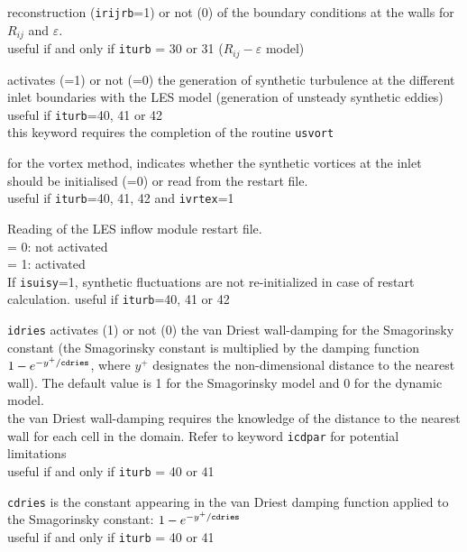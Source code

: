 {reconstruction ({\tt irijrb}=1)
or not (0) of the boundary conditions at the walls for $R_{ij}$ and  $\varepsilon$.\\
useful if and only if {\tt iturb} = 30 or 31 ($R_{ij}-\varepsilon$ model)}



{activates (=1) or not (=0) the generation of synthetic turbulence at the
different inlet boundaries with the LES model (generation of unsteady synthetic
eddies)\\
useful if {\tt iturb}=40, 41 or 42\\
this keyword requires the completion of the routine
\texttt{usvort}}

{for the vortex method, indicates whether the synthetic vortices at the inlet
should be initialised (=0) or read from the restart file.\\
useful if {\tt iturb}=40, 41, 42 and {\tt ivrtex}=1}

{Reading of the LES inflow module restart file.\\
\hspace*{1.3cm}= 0: not activated \\
\hspace*{1.3cm}= 1: activated\\
If {\tt isuisy}=1, synthetic fluctuations are not re-initialized in case of restart calculation.
useful if {\tt iturb}=40, 41 or 42
}

{{\tt idries} activates (1) or not (0) the van
Driest wall-damping for the Smagorinsky constant (the Smagorinsky
constant is multiplied by the damping function
$1-e^{-y^+/{\tt cdries}}$, where $y^+$ designates the non-dimensional
distance to the nearest wall). The default value is 1 for the
Smagorinsky model and 0 for the dynamic model.\\
the van Driest wall-damping requires the knowledge of the distance to the
nearest wall for each cell in the domain. Refer to keyword {\tt icdpar}
for potential limitations\\
useful if and only if {\tt iturb} = 40 or 41}

{{\tt cdries} is the constant appearing in the
van Driest damping function applied to the Smagorinsky constant:
 $1-e^{-y^+/{\tt cdries}}$\\
useful if and only if {\tt iturb} = 40 or 41}

